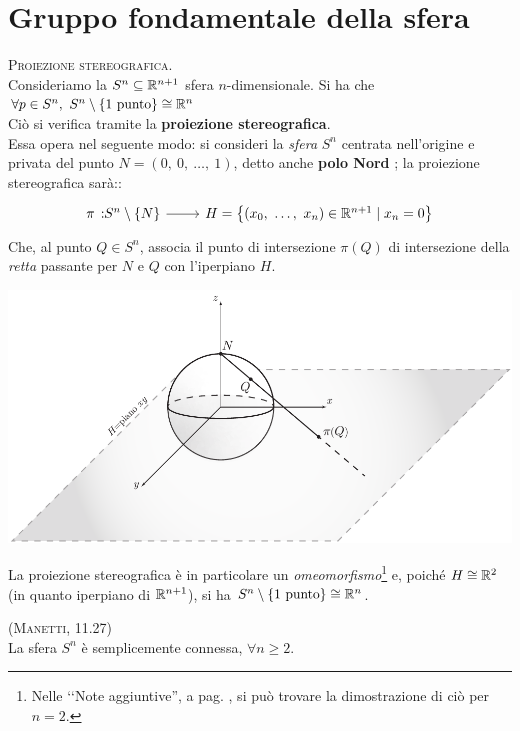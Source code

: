 \section{Gruppo fondamentale della sfera}
\begin{observe} \textsc{Proiezione stereografica.} \\
	Consideriamo la $S^n\subseteq \mathbb{R}^{n+1}$ sfera $n$-dimensionale. Si ha che $\forall p\in S^n,\ S^n\setminus \{1\text{ punto}\}\cong \mathbb{R}^n$\\
	Ciò si verifica tramite la \textbf{proiezione stereografica}.\\
	Essa opera nel seguente modo: si consideri la \textit{sfera} $S^n$ centrata nell'origine e privata del punto $N=(0,\ 0,\ \ldots,\ 1)$, detto anche \textbf{polo Nord} ; la proiezione stereografica sarà::
	\begin{equation}
		\funz {\pi}{S^n\setminus\{N\}}{H=\left\{\left(x_0,\ \ldots,\ x_n\right)\in\realset^{n+1}\mid x_n=0\right\}}
	\end{equation}
	 Che, al punto $Q\in S^n$, associa il punto di intersezione $\pi\left(Q\right)$ di intersezione della \textit{retta} passante per $N$ e $Q$ con l'iperpiano $H$.
	\begin{center}
	\includegraphics[trim=0cm 0cm 0cm 0cm,clip,scale=0.8]{images/stereo.pdf}
	\end{center}
	 La proiezione stereografica è in particolare un \textit{omeomorfismo}\footnote{Nelle ‘‘Note aggiuntive'', a pag. \pageref{proiezionestereograficanote}, si può trovare la dimostrazione di ciò per $n=2$.} e, poiché $H\cong\mathbb{R}^2$ (in quanto iperpiano di $\mathbb{R}^{n+1}$), si ha $S^n\setminus \{1\text{ punto}\}\cong \mathbb{R}^n$.
\end{observe}
\begin{corollary} \textsc{(Manetti, 11.27)} \label{sfere sempl. connesse} \\
	La sfera $S^n$ è semplicemente connessa, $\forall n\geq 2$.
\end{corollary}
